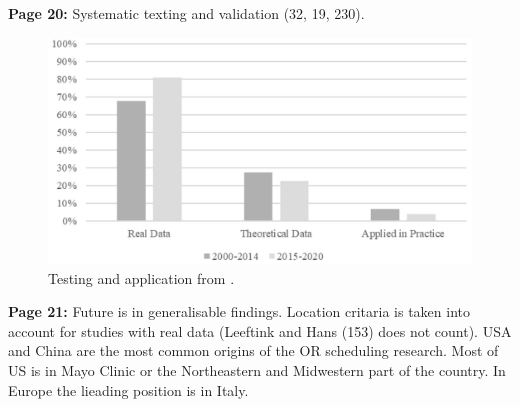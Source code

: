     \textbf{Page 20:}
    Systematic texting and validation (32, 19, 230).
    \begin{figure}[H]
        \centering
        \includegraphics[width=.8\textwidth]{figures/0002_SR02US22/fig3.png}
        \caption{Testing and application from \cite{x079}.}
        \label{fig3:SR02US22}
    \end{figure}

    \textbf{Page 21:}
    Future is in generalisable findings. Location critaria is taken into account for studies with real data (Leeftink and Hans (153) does not count). USA and China are the most common origins of the OR scheduling research. Most of US is in Mayo Clinic or the Northeastern and Midwestern part of the country. In Europe the lieading position is in Italy.
    
